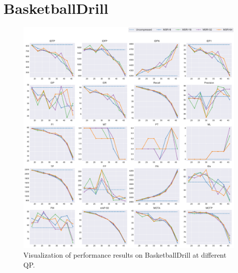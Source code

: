 
\section{BasketballDrill}
\label{sec:appendix/BasketballDrill_all}


\begin{figure}[!htbp]
\centering
\includegraphics[width=1.0\linewidth]{img/appendix/BasketballDrill_all_multiplots_qp.pdf}
\caption[Visualization of performance results on BasketballDrill at different QP]
{Visualization of performance results on BasketballDrill at different QP.}
\label{fig:BasketballDrill_all_qp}
\end{figure}


